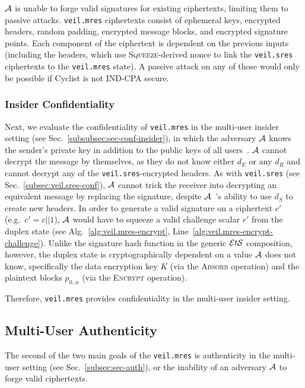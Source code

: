 $\mathcal{A}$ is unable to forge valid signatures for existing ciphertexts, limiting them to passive
attacks. \texttt{veil.mres} ciphertexts consist of ephemeral keys, encrypted headers, random
padding, encrypted message blocks, and encrypted signature points.
Each component of the ciphertext is dependent on the previous inputs (including the headers, which
use \textsc{Squeeze}\@-derived nonce to link the \texttt{veil.sres} ciphertexts to the
\texttt{veil.mres} state). A passive attack on any of those would only be possible if Cyclist is not
IND-CPA secure.

\subsubsection{Insider Confidentiality}

Next, we evaluate the confidentiality of \texttt{veil.mres} in the multi-user insider setting (see
Sec.~\ref{subsubsec:sec-conf-insider}), in which the adversary $\mathcal{A}$ knows the sender's
private key in addition to the public keys of all users~\cite[p. 45--46]{baek2010}\@.
$\mathcal{A}$ cannot decrypt the message by themselves, as they do not know either $d_E$ or any $d_R$
and cannot decrypt any of the \texttt{veil.sres}\@-encrypted headers.
As with \texttt{veil.sres} (see Sec.~\ref{subsec:veil.sres-conf})\@, $\mathcal{A}$ cannot trick the
receiver into decrypting an equivalent message by replacing the signature, despite $\mathcal{A}$~'s
ability to use $d_S$ to create new headers.
In order to generate a valid signature on a ciphertext $c'$ (e.g.\ $c'=c||1$), $\mathcal{A}$ would
have to squeeze a valid challenge scalar $r'$ from the duplex state (see
Alg.~\ref{alg:veil.mres-encrypt}, Line~\ref{alg:veil.mres-encrypt-challenge}).
Unlike the signature hash function in the generic $\mathcal{E}t\mathcal{S}$ composition, however, the duplex state is
cryptographically dependent on a value $\mathcal{A}$ does not know, specifically the data encryption
key $K$ \@(via the \textsc{Absorb} operation) and the plaintext blocks $p_{0..n}$ (via the
\textsc{Encrypt} operation).

Therefore, \texttt{veil.mres} provides confidentiality in the multi-user insider setting.

\subsection{Multi-User Authenticity}\label{subsec:veil.mres-auth}

The second of the two main goals of the \texttt{veil.mres} is authenticity in the multi-user setting
(see Sec.~\ref{subsec:sec-auth}), or the inability of an adversary $\mathcal{A}$ to forge valid
ciphertexts.

